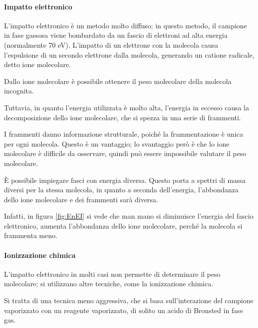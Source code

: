 \paragraph{Impatto elettronico}

L'impatto elettronico è un metodo molto diffuso; in questo metodo, il
campione in fase gassosa viene bombardato da un fascio di elettroni ad
alta energia (normalmente 70 eV). L'impatto di un elettrone con la
molecola causa l'espulsione di un secondo elettrone dalla molecola,
generando un catione radicale, detto ione molecolare.


\begin{center}
\end{center}

Dallo ione molecolare è possibile ottenere il peso molecolare della
molecola incognita.

Tuttavia, in quanto l'energia utilizzata è molto alta, l'energia in
eccesso causa la decomposizione dello ione molecolare, che si spezza in
una serie di frammenti.

I frammenti danno informazione strutturale, poiché la frammentazione è
unica per ogni molecola. Questo è un vantaggio; lo svantaggio però è che
lo ione molecolare è difficile da osservare, quindi può essere
impossibile valutare il peso molecolare.

È possibile impiegare fasci con energia diversa. Questo porta a spettri
di massa diversi per la stessa molecola, in quanto a seconda
dell'energia, l'abbondanza dello ione molecolare e dei frammenti sarà
diversa.

Infatti, in figura \ref{fig:EnEI} si vede che man mano si diminuisce l'energia del
fascio elettronico, aumenta l'abbondanza dello ione molecolare, perché
la molecola si frammenta meno.


\paragraph{Ionizzazione chimica}

L'impatto elettronico in molti casi non permette di determinare il peso
molecolare; si utilizzano altre tecniche, come la ionizzazione chimica.

Si tratta di una tecnica meno aggressiva, che si basa sull'interazione
del campione vaporizzato con un reagente vaporizzato, di solito un acido
di Bronsted in fase gas.

